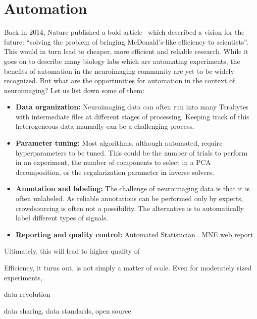 \section{Automation}
Back in 2014, Nature published a bold article~\citep{hayden2014automated} which described a vision for the future: ``solving the problem of bringing McDonald's-like efficiency to scientists''. This would in turn lead to cheaper, more efficient and reliable research. While it goes on to describe many biology labs which are automating experiments, the benefits of automation in the neuroimaging community are yet to be widely recognized. But what are the opportunities for automation in the context of neuroimaging? Let us list down some of them:
\begin{itemize}[noitemsep,nolistsep,nosep]
\item \textbf{Data organization:} Neuroimaging data can often run into many Terabytes with intermediate files at different stages of processing. Keeping track of this heterogeneous data manually can be a challenging process.
\item \textbf{Parameter tuning:} Most algorithms, although automated, require hyperparameters to be tuned. This could be the number of trials to perform in an experiment, the number of components to select in a \ac{PCA} decomposition, or the regularization parameter in inverse solvers.
\item \textbf{Annotation and labeling:} The challenge of neuroimaging data is that it is often unlabeled. As reliable annotations can be performed only by experts, crowdsourcing is often not a possibility. The alternative is to automatically label different types of signals.
\item \textbf{Reporting and quality control:} Automated Statistician . \ac{MNE} web report
\end{itemize}
Ultimately, this will lead to higher quality of 

Efficiency, it turns out, is not simply a matter of scale. Even for moderately sized experiments,

%

data revolution


data sharing, data standards, open source

